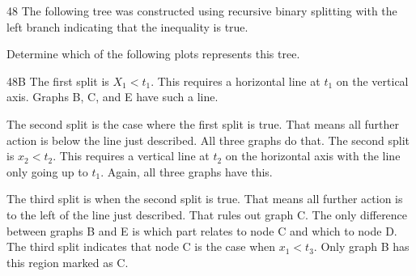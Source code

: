 \begin{question}{48}
The following tree was constructed using recursive binary splitting with the left branch indicating that the inequality is true.


Determine which of the following plots represents this tree.

\begin{choices}
\item {}
\item {}
\item {}
\item {}
\item {}
\end{choices}
\end{question}
\begin{solution}{48}{B}
The first split is $X_1 < t_1$. This requires a horizontal line at $t_1$ on the vertical axis. Graphs B, C, and E have such a line.

The second split is the case where the first split is true. That means all further action is below the line just described. All three graphs do that. The second split is $x_2 < t_2$. This requires a vertical line at $t_2$ on the horizontal axis with the line only going up to $t_1$. Again, all three graphs have this.

The third split is when the second split is true. That means all further action is to the left of the line just described. That rules out graph C. The only difference between graphs B and E is which part relates to node C and which to node D. The third split indicates that node C is the case when $x_1 < t_3$. Only graph B has this region marked as C.
\end{solution}

